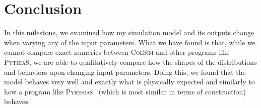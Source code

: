 \section{Conclusion}

In this milestone, we examined how my simulation model and its outputs change when varying any of the input parameters. What we have found is that, while we cannot compare exact numerics between \textsc{ColSim} and other programs like \textsc{Pythia8}, we are able to qualitatively compare how the shapes of the distributions and behaviors upon changing input parameters. Doing this, we found that the model behaves very well and exactly what is physically expected and similarly to how a program like \textsc{Pyresias}~\cite{PYRESIAS} (which is most similar in terms of construction) behaves.



